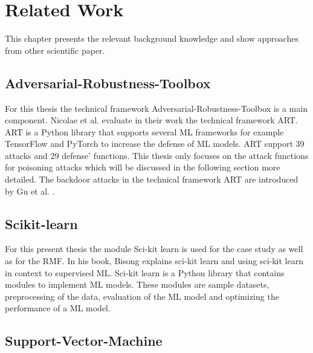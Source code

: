
\section{Related Work}
\label{sec:relWork}

This chapter presents the relevant background knowledge and show approaches from other scientific paper.

\subsection{Adversarial-Robustness-Toolbox}

For this thesis the technical framework Adversarial-Robustness-Toolbox \cite{art2018} is a main component. Nicolae et al. \cite{DBLP:journals/corr/abs-1807-01069} evaluate in their work
the technical framework ART. ART is a Python library that supports several ML frameworks for example TensorFlow and PyTorch to increase the defense of ML models. ART support 39 attacks
and 29 defense' functions. This thesis only focuses on the attack functions for poisoning attacks which will be discussed in the following section more detailed. The backdoor attacks in
the technical framework ART are introduced by Gu et al. \cite{DBLP:journals/corr/abs-1708-06733}.

\subsection{Scikit-learn}

For this present thesis the module Sci-kit learn is used for the case study as well as for the RMF. In his book, Bisong \cite{Bisong_2019} explains sci-kit learn and using sci-kit learn
in context to supervised ML. Sci-kit learn is a Python library that contains modules to implement ML models. These modules are sample datasets, preprocessing of the data, evaluation of
the ML model and optimizing the performance of a ML model.

\subsection{Support-Vector-Machine}

